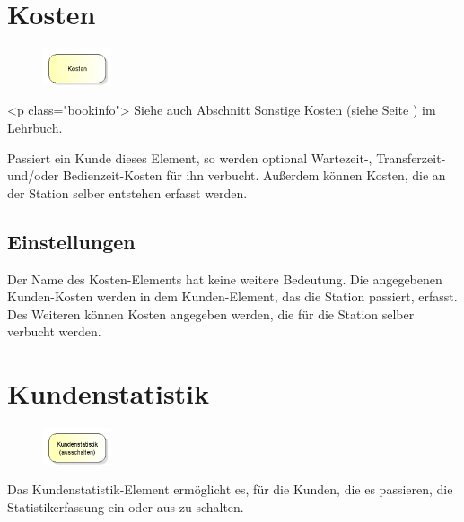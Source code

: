 \section{Kosten}
\label{ref:ModelElementCosts}

\begin{figure}
\vspace{-22pt}
\includegraphics[width=2cm]{imageModelElementCosts.png}
\vspace{-22pt}
\end{figure}

<p class="bookinfo">
Siehe auch Abschnitt Sonstige Kosten (siehe Seite \pageref{ref:book:8.7.4}) im Lehrbuch.

Passiert ein Kunde dieses Element, so werden optional Wartezeit-, Transferzeit- und/oder Bedienzeit-Kosten für ihn
verbucht. Außerdem können Kosten, die an der Station selber entstehen erfasst werden.

\subsection*{Einstellungen}

Der Name des Kosten-Elements hat keine weitere Bedeutung. Die angegebenen Kunden-Kosten werden in dem Kunden-Element,
das die Station passiert, erfasst. Des Weiteren können Kosten angegeben werden, die für die Station selber verbucht
werden.


\section{Kundenstatistik}
\label{ref:ModelElementSetStatisticsMode}

\begin{figure}
\vspace{-22pt}
\includegraphics[width=2cm]{imageModelElementSetStatisticsMode.png}
\vspace{-22pt}
\end{figure}

Das Kundenstatistik-Element ermöglicht es, für die Kunden, die es passieren,
die Statistikerfassung ein oder aus zu schalten.

